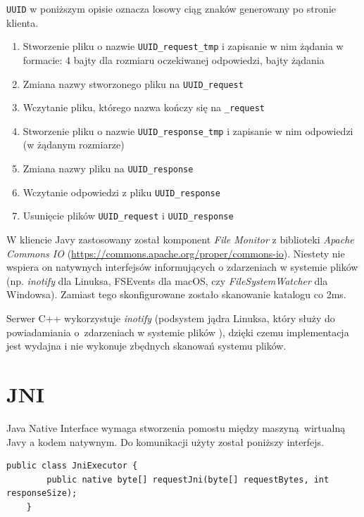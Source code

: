 \texttt{UUID} w poniższym opisie oznacza losowy ciąg znaków generowany po stronie klienta.
\begin{enumerate}
    \item Stworzenie pliku o nazwie \texttt{UUID\_request\_tmp} i zapisanie w nim żądania w formacie: 4 bajty dla rozmiaru oczekiwanej odpowiedzi, bajty żądania
    \item Zmiana nazwy stworzonego pliku na \texttt{UUID\_request}
    \item Wczytanie pliku, którego nazwa kończy się na \texttt{\_request}
    \item Stworzenie pliku o nazwie \texttt{UUID\_response\_tmp} i zapisanie w nim odpowiedzi (w żądanym rozmiarze)
    \item Zmiana nazwy pliku na \texttt{UUID\_response}
    \item Wczytanie odpowiedzi z pliku \texttt{UUID\_response}
    \item Usunięcie plików \texttt{UUID\_request} i \texttt{UUID\_response}
\end{enumerate}

W kliencie Javy zastosowany został komponent \textit{File Monitor} z biblioteki \textit{Apache Commons IO} (\url{https://commons.apache.org/proper/commons-io}). Niestety nie wspiera on natywnych interfejsów informujących o zdarzeniach w systemie plików (np. \textit{inotify} dla Linuksa, FSEvents dla macOS, czy \textit{FileSystemWatcher} dla Windowsa). Zamiast tego skonfigurowane zostało skanowanie katalogu co 2ms.

Serwer C++ wykorzystuje \textit{inotify} (podsystem jądra Linuksa, który służy do powiadamiania o~zdarzeniach w systemie plików \cite{inotify_man}), dzięki czemu implementacja jest wydajna i nie wykonuje zbędnych skanowań systemu plików.


\section{JNI}

Java Native Interface wymaga stworzenia pomostu między maszyną wirtualną Javy a kodem natywnym. Do komunikacji użyty został poniższy interfejs.

\clearpage

\begin{lstlisting}[caption={Metoda javy, która wymaga natywnej implementacji.},captionpos=b]
    public class JniExecutor {
        public native byte[] requestJni(byte[] requestBytes, int responseSize);
    }
\end{lstlisting}

